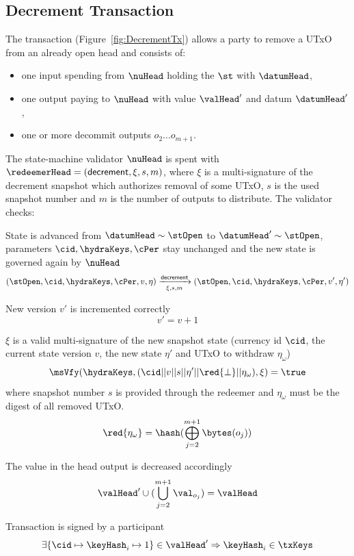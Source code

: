 \subsection{Decrement Transaction}\label{sec:decrement-tx}

\noindent The \mtxDecrement{} transaction (Figure~\ref{fig:DecrementTx}) allows
a party to remove a UTxO from an already open head and consists of:

\begin{itemize}
	\item one input spending from $\nuHead$ holding the $\st$ with $\datumHead$,
	\item one output paying to $\nuHead$ with value $\valHead'$ and
	      datum $\datumHead'$,
	\item one or more decommit outputs $o_{2} \dots o_{m+1}$.
\end{itemize}

\noindent The state-machine validator $\nuHead$ is spent with
$\redeemerHead = (\mathsf{decrement}, \xi, s, m)$, where $\xi$ is a multi-signature of
the decrement snapshot which authorizes removal of some UTxO, $s$ is the
used snapshot number and $m$ is the number of outputs to distribute. The
validator checks:
\begin{menumerate}
	\item State is advanced from $\datumHead \sim \stOpen$ to
	$\datumHead' \sim \stOpen$, parameters $\cid,\hydraKeys,\cPer$ stay
	unchanged and the new state is governed again by $\nuHead$
	\[
		(\stOpen,\cid,\hydraKeys,\cPer,v,\eta) \xrightarrow[\xi, s, m]{\mathsf{decrement}} (\stOpen,\cid,\hydraKeys,\cPer,v',\eta')
	\]
	\item New version $v'$ is incremented correctly
	\[
		v' = v + 1
	\]
	\item $\xi$ is a valid multi-signature of the new snapshot state (currency id $\cid$, the current state version $v$, the new state $\eta'$  and UTxO to withdraw $\eta_\omega$)
	\[
		\msVfy(\hydraKeys,(\cid || v || s || \eta' || \red{\bot} || \eta_\omega),\xi) = \true
	\]
    where snapshot number $s$ is provided through the redeemer and $\eta_\omega$ must be the digest of all removed UTxO.
	\[
		\red{\eta_\omega} = \hash(\bigoplus_{j=2}^{m+1} \bytes(o_{j}))
	\]
	\item The value in the head output is decreased accordingly
	\[
		\valHead' \cup (\bigcup_{j=2}^{m+1} \val_{o_{j}}) = \valHead
	\]
	\item Transaction is signed by a participant
	\[
		\exists \{\cid \mapsto \keyHash_{i} \mapsto 1\} \in \valHead' \Rightarrow \keyHash_{i} \in \txKeys
	\]
\end{menumerate}

